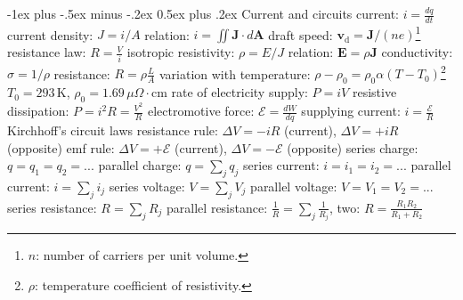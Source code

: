 \documentclass[10pt,landscape]{article}
\makeatletter
\renewcommand{\subsection}{\@startsection{subsection}{2}{0mm}%
                                {-1ex plus -.5ex minus -.2ex}%
                                {0.5ex plus .2ex}%
                                {\normalfont\normalsize\bfseries}}
\newcommand{\spc}{\hspace*{1em}}
\makeatother
\begin{document}
\begin{multicols*}{3}
\subsection{Current and circuits}
current: $i=\frac{dq}{dt}$
\newline
current density: $J=i/A$
\newline
\spc relation: $i=\iint \mathbf{J}\cdot d\mathbf{A}$
\newline
\spc draft speed: $\mathbf{v}_\mathrm{d}=\mathbf{J}/(ne)$\footnote{ $n$: number of carriers per unit volume.}
\newline
resistance law: $R=\frac{V}{i}$
\newline
isotropic resistivity: $\rho=E/J$
\newline
\spc relation: $\mathbf{E}=\rho \mathbf{J}$
\newline
conductivity: $\sigma =1/\rho $
\newline
resistance: $R=\rho \frac{L}{A}$
\newline
\spc variation with temperature: $\rho -\rho _0=\rho _0\alpha (T-T_0)$\footnote{$\rho$: temperature coefficient of resistivity.}
\newline
\spc \spc$T_0=293\,\textrm{K}$, $\rho_0=1.69\,\mu\Omega\cdot\textrm{cm}$
\newline
rate of electricity supply: $P=iV$
\newline
\spc resistive dissipation: $P=i^2R=\frac{V^2}{R}$
\newline
electromotive force: $\mathscr{E} =\frac{dW}{dq}$
\newline
\spc supplying current: $i=\frac{\mathscr{E} }{R}$
\newline \newline
Kirchhoff's circuit laws
\newline
\spc resistance rule: $\Delta V=-iR$ (current), $\Delta V=+iR$ (opposite)
\newline
\spc emf rule: $\Delta V=+\mathscr{E} $ (current), $\Delta V=-\mathscr{E} $ (opposite)
\newline \newline
series charge: $q=q_1=q_2=...$
\newline
parallel charge: $q=\sum_j q_j$
\newline
series current: $i=i_1=i_2=...$
\newline
parallel current: $i=\sum_j i_j$
\newline
series voltage: $V=\sum _j V_j$
\newline
parallel voltage: $V=V_1=V_2=...$
\newline
series resistance: $R=\sum _j R_j$
\newline
parallel resistance: $\frac{1}{R}=\sum _j \frac{1}{R_j}$, two: $R=\frac{R_1R_2}{R_1+R_2}$
\newpage


\end{multicols*}
\end{document}
